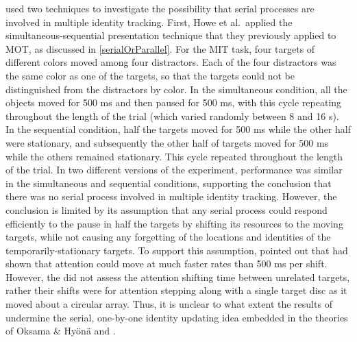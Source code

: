 \documentclass[
]{book}
\begin{document}
\citet{howeIdentityLocationBindingProblem2015a} used two techniques to investigate the possibility that serial processes are involved in multiple identity tracking. First, Howe et al.~applied the simultaneous-sequential presentation technique that they previously applied to MOT,
as discussed in \ref{serialOrParallel}. For the MIT task, four targets of different colors moved among four distractors. Each of the four distractors was the same color as one of the targets, so that the targets could not be distinguished from the distractors by color. In the simultaneous condition, all the objects moved for 500 ms and then paused for 500 ms, with this cycle repeating throughout the length of the trial (which varied randomly between 8 and 16 s). In the sequential condition, half the targets moved for 500 ms while the other half were stationary, and subsequently the other half of targets moved for 500 ms while the others remained stationary. This cycle repeated throughout the length of the trial. In two different versions of the experiment, performance was similar in the simultaneous and sequential conditions, supporting the conclusion that there was no serial process involved in multiple identity tracking. However, the \citet{howeIdentityLocationBindingProblem2015a} conclusion is limited by its assumption that any serial process could respond efficiently to the pause in half the targets by shifting its resources to the moving targets, while not causing any forgetting of the locations and identities of the temporarily-stationary targets. To support this assumption, \citet{howeIdentityLocationBindingProblem2015a} pointed out that \citet{hogendoornTimeCourseAttentive2007} had shown that attention could move at much faster rates than 500 ms per shift. However, the \citet{hogendoornTimeCourseAttentive2007} did not assess the attention shifting time between unrelated targets, rather their shifts were for attention stepping along with a single target disc as it moved about a circular array. Thus, it is unclear to what extent the results of \citet{howeIdentityLocationBindingProblem2015a} undermine the serial, one-by-one identity updating idea embedded in the theories of Oksama \& Hyönä and \citet{lovettSelectionEnablesEnhancement2019}.
\end{document}
